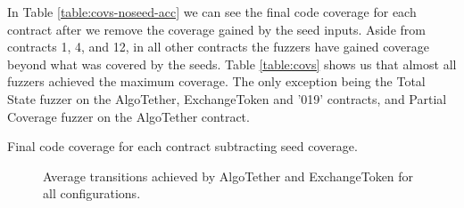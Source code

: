 In Table \ref{table:covs-noseed-acc} we can see the final code coverage for each contract after we remove the coverage gained by the seed inputs.
Aside from contracts 1, 4, and 12, in all other contracts the fuzzers have gained coverage beyond what was covered by the seeds.
Table \ref{table:covs} shows us that almost all fuzzers achieved the maximum coverage.
The only exception being the Total State fuzzer on the AlgoTether, ExchangeToken and '019' contracts, and Partial Coverage fuzzer on the AlgoTether contract.


\begin{table}[htbp]
    \centering
    \caption{Final code coverage for each contract subtracting seed coverage.}\label{table:covs-noseed-acc}
\end{table}



\begin{figure}[t]
    \centering
    \hfill
    \caption{Average transitions achieved by AlgoTether and ExchangeToken for all configurations.}
    \label{fig:unique_transitions}
\end{figure}

